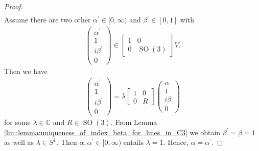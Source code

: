 \documentclass{amsart}
\newcommand{\C}{\mathbb{C}}
\DeclareMathOperator{\SO}{SO}
\begin{document}
\begin{proof}
{\begin{align*}
    \end{align*}
    Assume there are two other $\alpha^\prime \in [0, \infty)$ and $\beta^\prime \in [0,1]$ with 
    \begin{align*}
        \begin{pmatrix}
            \alpha^\prime \\ 1 \\i \beta^\prime \\ 0
        \end{pmatrix}
        \in\left[\begin{array}{c|c}
            1 & 0 \\
            \hline
            0 & \SO(3)
            \end{array}\right] V.
    \end{align*}
    Then we have
    \begin{align*}
        \begin{pmatrix}
            \alpha^\prime \\ 1 \\i \beta^\prime \\ 0
        \end{pmatrix}
        = \lambda \left[\begin{array}{c|c}
            1 & 0 \\
            \hline
            0 & R
            \end{array}\right] \begin{pmatrix}
            \alpha \\ 1 \\i \beta \\ 0
        \end{pmatrix}
    \end{align*}
    for some $\lambda \in \C$ and $R \in \SO(3)$. From Lemma \ref{lin::lemma:uniqueness_of_index_beta_for_lines_in_C3} we obtain $\beta^\prime = \beta = 1$ as well as $\lambda \in S^1$. Then $\alpha, \alpha^\prime \in [0, \infty)$ entails $\lambda = 1$. Hence, $\alpha = \alpha^\prime$.

}
\end{proof}
\end{document}
